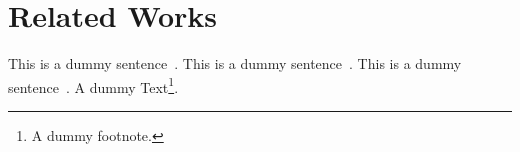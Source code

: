 \chapter{Related Works}

This is a dummy sentence~\cite{Alpher02}. This is a dummy sentence~\cite{Alpher03}. This is a dummy sentence~\cite{Alpher04}. A dummy Text\footnote{A dummy footnote.}.
